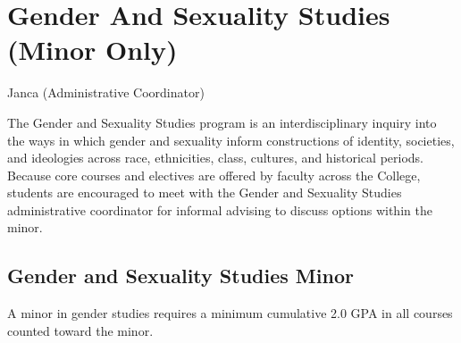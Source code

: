 \documentclass[
  letterpaper,
]{scrbook}
\begin{document}
\section{Gender And Sexuality Studies (Minor
Only)}\label{gender-and-sexuality-studies-minor-only}

Janca (Administrative Coordinator)

The Gender and Sexuality Studies program is an interdisciplinary inquiry
into the ways in which gender and sexuality inform constructions of
identity, societies, and ideologies across race, ethnicities, class,
cultures, and historical periods. Because core courses and electives are
offered by faculty across the College, students are encouraged to meet
with the Gender and Sexuality Studies administrative coordinator for
informal advising to discuss options within the minor.

\subsection{Gender and Sexuality Studies
Minor}\label{gender-and-sexuality-studies-minor}

A minor in gender studies requires a minimum cumulative 2.0 GPA in all
courses counted toward the minor.
\end{document}
